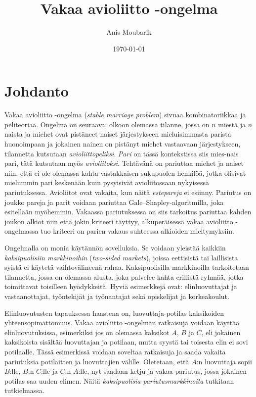 \documentclass[finnish]{tktltiki2}
\title{Vakaa avioliitto -ongelma}
\author{Anis Moubarik}
\date{\today}
\theoremstyle{definition}
\theoremstyle{remark}
\begin{document}

\frontmatter      %

\maketitle        %
\makeabstract     %

\tableofcontents  %


\mainmatter       %

\section{Johdanto}
Vakaa avioliitto -ongelma (\emph{stable marriage problem}) sivuaa kombinatoriikkaa ja peliteoriaa. Ongelma on seuraava: olkoon olemassa tilanne, jossa on $n$ miestä ja $n$ naista ja miehet ovat pistäneet naiset järjestykseen mieluisimmasta parista huonoimpaan ja jokainen nainen on pistänyt miehet vastaavaan järjestykseen, tilannetta kutsutaan \emph{avioliittopeliksi}. \emph{Pari} on tässä kontekstissa siis mies-nais pari, tätä kutsutaan myös \emph{avioliitoksi}. Tehtävänä on pariuttaa miehet ja naiset niin, että ei ole olemassa kahta vastakkaisen sukupuolen henkilöä, jotka olisivat mielummin pari keskenään kuin pysyisivät avioliitossaan nykyisessä pariutuksessa. Avioliitot ovat vakaita, kun näitä \emph{estepareja} ei esiinny. Pariutus on joukko pareja ja parit voidaan pariuttaa Gale--Shapley-algoritmilla, joka esitellään myöhemmin. Vakaassa pariutuksessa on siis tarkoitus pariuttaa kahden joukon alkiot niin että jokin kriteeri täyttyy, alkuperäisessä vakaa avioliitto -ongelmassa tuo kriteeri on parien vakaus suhteessa alkioiden mieltymyksiin.

Ongelmalla on monia käytännön sovelluksia. Se voidaan yleistää kaikkiin \emph{kaksipuolisiin markkinoihin} (\emph{two-sided markets}), joissa eettisistä tai laillisista syistä ei käytetä vaihtovälineenä rahaa. Kaksipuolisilla markkinoilla tarkoitetaan tilannetta, jossa on olemassa alusta, joka palvelee kahta erillistä ryhmää, jotka toimittavat toisilleen hyödykkeitä. Hyviä esimerkkejä ovat: elinluovuttajat ja vastaanottajat, työntekijät ja työnantajat sekä opiskelijat ja korkeakoulut.

Elinluovutusten tapauksessa haastena on, luovuttaja-potilas kaksikoiden yhteensopimattomuus. Vakaa avioliitto -ongelman ratkaisuja voidaan käyttää elinluovutuksissa, esimerkiksi jos on olemassa kaksikot $A$, $B$ ja $C$, eli jokainen kaksikoista sisältää luovuttajan ja potilaan, mutta syystä tai toisesta elin ei sovi potilaalle. Tässä esimerkissä voidaan soveltaa ratkaisuja ja saada vakaita pariutuksia potilaitten ja luovuttajien välille. Oletetaan, että $A$:n luovuttaja sopii $B$:lle, $B$:n $C$:lle ja $C$:n $A$:lle, nyt saadaan ketju ja vakaa pariutus, jossa jokainen potilas saa uuden elimen. Näitä \emph{kaksipuolisia pariutusmarkkinoita} tutkitaan tutkielmassa.
\end{document}

